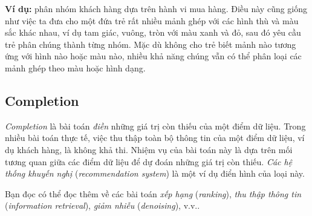 \textbf{Ví dụ:} phân nhóm khách hàng dựa
trên hành vi mua hàng. Điều này cũng giống như việc ta đưa cho một đứa trẻ rất
nhiều mảnh ghép với các hình thù và màu sắc khác nhau, ví dụ tam giác, vuông,
tròn với màu xanh và đỏ, sau đó yêu cầu trẻ phân chúng thành từng nhóm. Mặc dù
không cho trẻ biết mảnh nào tương ứng với hình nào hoặc màu nào, nhiều khả năng
chúng vẫn có thể phân loại các mảnh ghép theo màu hoặc hình dạng.

\subsection{Completion}
\textit{Completion} là bài toán \textit{điền} những giá trị còn thiếu của một
điểm dữ liệu. Trong nhiều bài toán thực tế, việc thu thập toàn bộ thông tin của
một điểm dữ liệu, ví dụ khách hàng, là không khả thi. Nhiệm vụ của bài toán này
là dựa trên mối tương quan giữa các điểm dữ liệu để dự đoán những giá trị còn
thiếu. \textit{Các hệ thống khuyến nghị} (\textit{recommendation system}) là
một ví
dụ điển hình của loại này. 

Bạn đọc có thể đọc thêm về các bài toán \textit{xếp hạng} (\textit{ranking}),
\textit{thu thập thông tin} (\textit{information retrieval}), \textit{giảm
nhiễu} (\textit{denoising}), v.v..









